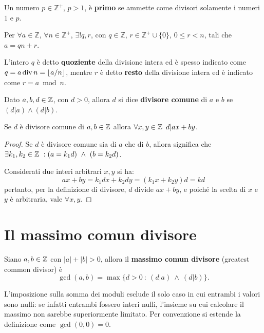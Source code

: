 \begin{definizione}
Un numero $p\in\mathbb{Z}^+$, $p>1$, è \textbf{primo} se ammette come divisori solamente i numeri $1$ e $p$.
\end{definizione}

\begin{teorema}
Per $\forall a\in\mathbb{Z}$, $\forall n\in\mathbb{Z}^+$, $\exists !q,r$, con $q\in\mathbb{Z}$, $r\in\mathbb{Z}^+\cup\{0\}$, $0 \leq r < n$, tali che $a=qn+r$.
\end{teorema}
L'intero $q$ è detto \textbf{quoziente} della divisione intera ed è spesso indicato come $q = a \operatorname*{div} n = \lfloor a/n\rfloor $, mentre $r$ è detto \textbf{resto} della divisione intera ed è indicato come $r = a \bmod n$.

\begin{definizione}
Dato $a,b,d\in\operatorname*{\mathbb{Z}}$, con $d>0$, allora $d$ si dice \textbf{divisore comune} di $a$ e $b$ se $(d|a) \land (d|b)$.
\end{definizione}

\begin{proposizione}
Se $d$ è divisore comune di $a,b\in\operatorname*{\mathbb{Z}}$ allora $\forall x,y\in\operatorname*{\mathbb{Z}}\ d|ax+by$.
\end{proposizione}
\begin{proof}
Se $d$ è divisore comune sia di $a$ che di $b$, allora significa che $\exists k_1,k_2\in\operatorname*{\mathbb{Z}}\ : (a=k_1d)\ \land\ (b=k_2d)$.

Considerati due interi arbitrari $x,y$ si ha:
\[
ax+by = k_1dx + k_2dy = (k_1x+k_2y)d = {k}d
\]
pertanto, per la definizione di divisore, $d$ divide $ax+by$, e poiché la scelta di $x$ e $y$ è arbitraria, vale $\forall x,y$.
\end{proof}

\section{Il massimo comun divisore}
\begin{definizione}
Siano $a,b\in\operatorname*{\mathbb{Z}}$ con $|a|+|b|>0$, allora il \textbf{massimo comun divisore} (greatest common divisor) è
\[
\gcd(a,b)=\max\{d>0\ :\ (d|a)\ \land\ (d|b)\}.
\]
\end{definizione}
L'imposizione sulla somma dei moduli esclude il solo caso in cui entrambi i valori sono nulli: se infatti entrambi fossero interi nulli, l'insieme su cui calcolare il massimo non sarebbe superiormente limitato. Per convenzione si estende la definizione come $\gcd(0,0)=0$.

